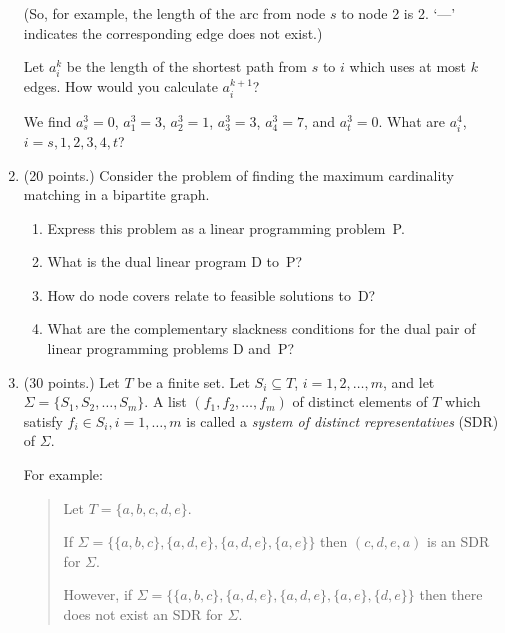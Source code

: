 \begin{enumerate}
(So, for example, the length of the arc from node $s$ to node 2 is 2.
`---' indicates the corresponding edge does not exist.)

Let $a_i^k$ be the length of the shortest path from $s$ to $i$ which uses
at most $k$ edges. How would you calculate $a_i^{k+1}$?

We find $a_s^3=0$, $a_1^3=3$, $a_2^3=1$, $a_3^3=3$, $a_4^3=7$, and
$a_t^3=0$.  What are $a_i^4$, $i=s,1,2,3,4,t$?

\newpage

   \item  (20 points.)
          Consider the problem of finding the maximum cardinality matching
          in a bipartite graph.
       \begin{enumerate}
          \item  Express this problem as a linear programming problem~P.
          \item  What is the dual linear program D to~P?
          \item  How do node covers relate to feasible solutions to~D?
          \item  What are the complementary slackness conditions for the
                 dual pair of linear programming problems D and~P?
       \end{enumerate}

\newpage

   \item  (30 points.)
          Let $T$ be a finite set.
          Let $S_i\subseteq{T}$, $i=1,2,\ldots,m$, and let
          $\Sigma=\{S_1,S_2,\ldots,S_m\}$.
          A list $(f_1,f_2,\ldots,f_m)$ of distinct elements
          of $T$ which satisfy 
          $f_i{\in}S_i,i=1,\ldots,m$
          is called a {\em system of distinct representatives} (SDR)
          of $\Sigma$.

          For example:
          \begin{quotation}
             Let $T=\{a,b,c,d,e\}$.

             If $\Sigma=\{\{a,b,c\},\{a,d,e\},\{a,d,e\},\{a,e\}\}$ then
               $(c,d,e,a)$ is an SDR for $\Sigma$.

             However, if 
             $\Sigma=\{\{a,b,c\},\{a,d,e\},\{a,d,e\},\{a,e\},\{d,e\}\}$ then
             there does not exist an SDR for $\Sigma$.
          \end{quotation}


\end{enumerate}
